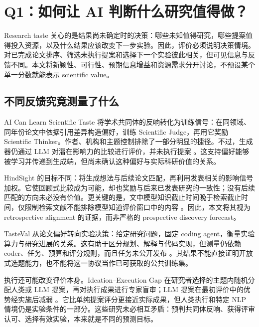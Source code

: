 \section{Q1：如何让 AI 判断什么研究值得做？}
\label{sec:taste}

Research taste 关心的是结果尚未确定时的决策：哪些未知值得研究，哪些提案值得投入资源，以及什么结果应该改变下一步实验。因此，评价必须说明决策情境。对已完成论文排序、筛选未执行提案和选择下一个实验彼此相关，但可见信息与反馈不同。本文将新颖性、可行性、预期信息增益和资源需求分开讨论，不预设某个单一分数就能表示 scientific value。

\subsection{不同反馈究竟测量了什么}

AI Can Learn Scientific Taste 将学术共同体的反响转化为训练信号：在同领域、同年份论文中依据引用差异构造偏好，训练 Scientific Judge，再用它奖励 Scientific Thinker。作者、机构和主题控制排除了一部分明显的捷径。不过，生成器仍通过 LLM 对潜在影响力的比较进行评价，并未执行提案 \cite{ai-can-learn-scientific-taste}。这支持偏好能够被学习并传递到生成端，但尚未确认这种偏好与实际科研价值的关系。

HindSight 的目标不同：将生成想法与后续论文匹配，再利用发表相关的影响信号加权。它使回顾式比较成为可能，却也奖励与后来已发表研究的一致性；没有后续匹配的方向未必没有价值。更关键的是，文中模型知识截止时间晚于检索截止时间，仅限制检索文献不能排除模型知道评价窗口中的内容 \cite{hindsight}。因此，本文将其视为 retrospective alignment 的证据，而非严格的 prospective discovery forecast。

TasteVal 从论文偏好转向实验决策：给定研究问题，固定 coding agent，衡量实验算力与研究进展的关系。这有助于区分规划、解释与代码实现，但测量仍依赖 coder、任务、预算和评分规则，而且任务未公开发布 \cite{tasteval}。其结果不能直接证明开放式选题能力，也不能将这一协议当作已可获取的公共训练集。

执行还可能改变评价本身。Ideation--Execution Gap 在研究者选择的主题内随机分配人类或 LLM 提案，再对执行成果进行专家盲审；LLM 提案在最初评价中的优势经实施后减弱 \cite{ideation-execution-gap}。它比单纯提案评分更接近实际成果，但人类执行和特定 NLP 情境仍是实验条件的一部分。这些研究未必相互矛盾：预判共同体反响、获得评审认可、选择有效实验，本来就是不同的预测目标。

